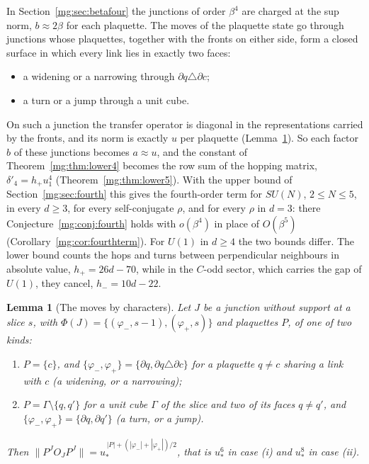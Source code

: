 \documentclass[11pt,a4paper]{article}
\newtheorem{lemma}[theorem]{Lemma}
\theoremstyle{definition}
\theoremstyle{remark}
\newcommand{\norm}[1]{\lVert #1\rVert}
\begin{document}
In Section~\ref{mg:sec:betafour} the junctions of order $\beta^4$ are charged at the sup norm, $b\approx2\beta$ for each plaquette. The moves of the plaquette state
go through junctions whose plaquettes, together with the fronts on either side, form a closed surface in which every link lies in exactly two faces:
\begin{itemize}
\item a widening or a narrowing through $\partial q\triangle\partial c$;
\item a turn or a jump through a unit cube.
\end{itemize}
On such a junction the transfer operator is diagonal in the representations carried by the fronts, and its norm is exactly $u$ per plaquette
(Lemma~\ref{mg:lem:moves}). So each factor $b$ of these junctions becomes $a\approx u$, and the constant of Theorem~\ref{mg:thm:lower4} becomes the row sum of the
hopping matrix, $\delta'_4=h_+u_1^4$ (Theorem~\ref{mg:thm:lower5}). With the upper bound of Section~\ref{mg:sec:fourth} this gives the fourth-order term for
$SU(N)$, $2\le N\le5$, in every $d\ge3$, for every self-conjugate $\rho$, and for every $\rho$ in $d=3$: there Conjecture~\ref{mg:conj:fourth} holds with $o(\beta^4)$ in place of $O(\beta^5)$
(Corollary~\ref{mg:cor:fourthterm}). For $U(1)$ in $d\ge4$ the two bounds differ. The lower bound counts the hops and turns between perpendicular neighbours in
absolute value, $h_+=26d-70$, while in the $C$-odd sector, which carries the gap of $U(1)$, they cancel, $h_-=10d-22$.

\begin{lemma}[The moves by characters]\label{mg:lem:moves}
Let $J$ be a junction without support at a slice $s$, with $\Phi(J)=\{(\varphi_-,s-1),(\varphi_+,s)\}$ and plaquettes $P$, of one of two kinds:
\begin{enumerate}[label=(\roman*)]
\item $P=\{c\}$, and $\{\varphi_-,\varphi_+\}=\{\partial q,\partial q\triangle\partial c\}$ for a plaquette $q\ne c$ sharing a link with $c$ (a widening, or a narrowing);
\item $P=\Gamma\setminus\{q,q'\}$ for a unit cube $\Gamma$ of the slice and two of its faces $q\ne q'$, and $\{\varphi_-,\varphi_+\}=\{\partial q,\partial q'\}$ (a turn, or a jump).
\end{enumerate}
Then $\norm{P^JO_JP^J}=u_*^{\,|P|+(|\varphi_-|+|\varphi_+|)/2}$, that is $u_*^6$ in case (i) and $u_*^8$ in case (ii).
\end{lemma}
\end{document}
